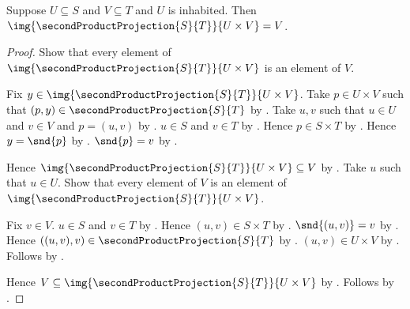 \begin{proposition}\label{second_projection_image_rectangle}
    Suppose $U\subseteq S$ and $V\subseteq T$ and $U$ is inhabited.
    Then
        $\img{\secondProductProjection{S}{T}}{U\times V}=V$.
\end{proposition}
\begin{proof}
    Show that every element of
        $\img{\secondProductProjection{S}{T}}{U\times V}$ is an element
        of $V$.
    \begin{subproof}
        Fix $y\in\img{\secondProductProjection{S}{T}}{U\times V}$.
        Take $p\in U\times V$ such that
            $(p,y)\in\secondProductProjection{S}{T}$ by .
        Take $u,v$ such that $u\in U$ and $v\in V$ and $p=(u,v)$ by
            .
        $u\in S$ and $v\in T$ by .
        Hence $p\in S\times T$ by .
        Hence $y=\snd{p}$ by .
        $\snd{p}=v$ by .
    \end{subproof}
    Hence $\img{\secondProductProjection{S}{T}}{U\times V}
        \subseteq V$ by .
    Take $u$ such that $u\in U$.
    Show that every element of $V$ is an element of
        $\img{\secondProductProjection{S}{T}}{U\times V}$.
    \begin{subproof}
        Fix $v\in V$.
        $u\in S$ and $v\in T$ by .
        Hence $(u,v)\in S\times T$ by .
        $\snd{(u,v)}=v$ by .
        Hence $((u,v),v)\in\secondProductProjection{S}{T}$ by
            .
        $(u,v)\in U\times V$ by .
        Follows by .
    \end{subproof}
    Hence $V\subseteq
        \img{\secondProductProjection{S}{T}}{U\times V}$ by
        .
    Follows by .
\end{proof}


